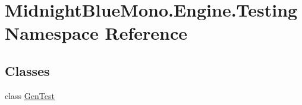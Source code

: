 \hypertarget{namespace_midnight_blue_mono_1_1_engine_1_1_testing}{}\section{Midnight\+Blue\+Mono.\+Engine.\+Testing Namespace Reference}
\label{namespace_midnight_blue_mono_1_1_engine_1_1_testing}
\subsection*{Classes}
\begin{DoxyCompactItemize}
\item 
class \hyperlink{class_midnight_blue_mono_1_1_engine_1_1_testing_1_1_gen_test}{Gen\+Test}
\end{DoxyCompactItemize}

